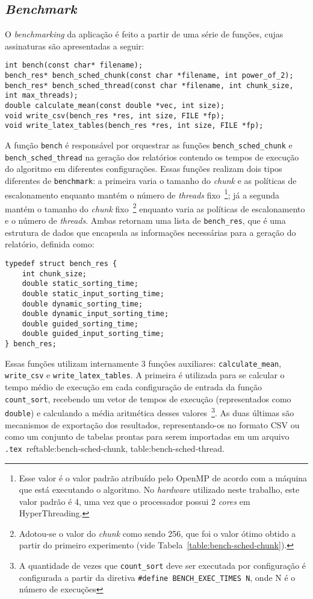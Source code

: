 \documentclass[12pt,a4paper]{article}
\begin{document}
\subsection{\textit{Benchmark}}
O \textit{benchmarking} da aplicação é feito a partir de uma série de funções,
cujas assinaturas são apresentadas a seguir:

\begin{verbatim}
int bench(const char* filename);
bench_res* bench_sched_chunk(const char *filename, int power_of_2);
bench_res* bench_sched_thread(const char *filename, int chunk_size, int max_threads);
double calculate_mean(const double *vec, int size);
void write_csv(bench_res *res, int size, FILE *fp);
void write_latex_tables(bench_res *res, int size, FILE *fp);
\end{verbatim}

A função \texttt{bench} é responsável por orquestrar as funções
\texttt{bench\_sched\_chunk} e \texttt{bench\_sched\_thread} na geração dos
relatórios contendo os tempos de execução do algoritmo em diferentes
configurações. Essas funções realizam dois tipos diferentes de
\texttt{benchmark}: a primeira varia o tamanho do \textit{chunk} e as políticas
de escalonamento enquanto mantém o número de \textit{threads}
fixo~\footnote{Esse valor é o valor padrão atribuído pelo OpenMP de acordo com a
máquina que está executando o algoritmo. No \textit{hardware} utilizado neste
trabalho, este valor padrão é 4, uma vez que o processador possui 2
\textit{cores} em HyperThreading.}; já a segunda mantém o tamanho do
\textit{chunk} fixo~\footnote{Adotou-se o valor do \textit{chunk} como sendo
256, que foi o valor ótimo obtido a partir do primeiro experimento (vide
Tabela~\ref{table:bench-sched-chunk}).} enquanto varia as políticas de
escalonamento e o número de \textit{threads}. Ambas retornam uma lista de
\texttt{bench\_res}, que é uma estrutura de dados que encapsula as informações
necessárias para a geração do relatório, definida como:

\begin{verbatim}
typedef struct bench_res {
    int chunk_size;
    double static_sorting_time;
    double static_input_sorting_time;
    double dynamic_sorting_time;
    double dynamic_input_sorting_time;
    double guided_sorting_time;
    double guided_input_sorting_time;
} bench_res;
\end{verbatim}

Essas funções utilizam internamente 3 funções auxiliares:
\texttt{calculate\_mean}, \texttt{write\_csv} e \texttt{write\_latex\_tables}. A
primeira é utilizada para se calcular o tempo médio de execução em cada
configuração de entrada da função \texttt{count\_sort}, recebendo um vetor de
tempos de execução (representados como \texttt{double}) e calculando a média
aritmética desses valores~\footnote{A quantidade de vezes que
\texttt{count\_sort} deve ser executada por configuração é configurada a partir
da diretiva \texttt{\#define BENCH\_EXEC\_TIMES N}, onde N é o número de
execuções}. As duas últimas são mecanismos de exportação dos resultados,
representando-os no formato CSV ou como um conjunto de tabelas prontas para
serem importadas em um arquivo \texttt{.tex}~ref{table:bench-sched-chunk,
table:bench-sched-thread}.
 
\end{document}
